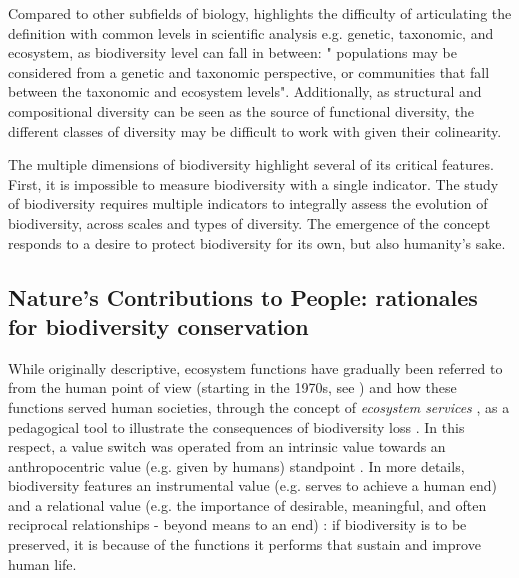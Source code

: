 Compared to other subfields of biology,  \cite{mouysset_diversity_2023} highlights the difficulty of articulating the definition with common levels in scientific analysis e.g. genetic, taxonomic, and ecosystem, as biodiversity level can fall in between: " populations may be considered from a genetic and taxonomic perspective, or communities that fall between the taxonomic and ecosystem levels". Additionally, as structural and compositional diversity can be seen as the source of functional diversity, the different classes of diversity may be difficult to work with given their colinearity. 

The multiple dimensions of biodiversity highlight several of its critical features. First, it is impossible to measure biodiversity with a single indicator. The study of biodiversity requires multiple indicators to integrally assess the evolution of biodiversity, across scales and types of diversity. The emergence of the concept responds to a desire to protect biodiversity for its own, but also humanity's sake. 

\subsection*{Nature's Contributions to People: rationales for biodiversity conservation}

While originally descriptive, ecosystem functions have gradually been referred to from the human point of view (starting in the 1970s, see  \cite{hueting1969functions, schumacher1973small}) and how these functions served human societies, through the concept of \textit{ecosystem services} \citep{ehrlich1981extinction}, as a pedagogical tool to illustrate the consequences of biodiversity loss \citep{gomez_history_2010}.  In this respect, a value switch was operated from an intrinsic value towards an anthropocentric value (e.g. given by humans) standpoint \citep{mouysset_diversity_2023}. In more details, biodiversity features an instrumental value (e.g. serves to achieve a human end) and a relational value (e.g. the importance of desirable, meaningful, and often reciprocal relationships - beyond means to an end) : if biodiversity is to be preserved, it is because of the functions it performs that sustain and improve human life.

